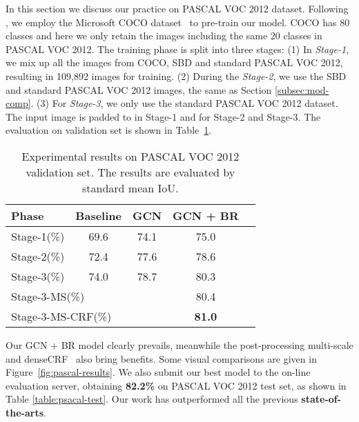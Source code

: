 \documentclass[10pt,twocolumn,letterpaper]{article}
\begin{document}
\label{sec:pascal-voc-2012}
   In this section we discuss our practice on PASCAL VOC 2012 dataset. Following \cite{chen14semantic,zheng2015conditional,liu2015semantic,chen2016deeplab}, we employ the Microsoft COCO dataset~\cite{lin2014microsoft} to pre-train our model. COCO has 80 classes and here we only retain the images including the same 20 classes in PASCAL VOC 2012. The training phase is split into three stages: (1) In \emph{Stage-1}, we mix up all the images from COCO, SBD and standard PASCAL VOC 2012, resulting in 109,892 images for training. (2) During the \emph{Stage-2}, we use the SBD and standard PASCAL VOC 2012 images, the same as Section \ref{subsec:mod-comp}. (3) For \emph{Stage-3}, we only use the standard PASCAL VOC 2012 dataset. The input image is padded to  in Stage-1 and  for Stage-2 and Stage-3. The evaluation on validation set is shown in Table~\ref{table:psacal-val}. 
   \begin{table}[h]
      \begin{center}
         \begin{tabular}{|l|c|c|c|c|}
            \hline
            Phase  & Baseline & GCN & GCN + BR \\
            \hline
            Stage-1(\%) & 69.6 & 74.1 & 75.0\\
            \hline
            Stage-2(\%) & 72.4 & 77.6 & 78.6\\
            \hline 
            Stage-3(\%) & 74.0 & 78.7 & 80.3\\
            \hline
            \hline 
            \multicolumn{3}{|l|}{Stage-3-MS(\%)} & 80.4\\
            \hline
            \multicolumn{3}{|l|}{Stage-3-MS-CRF(\%)} & \textbf{81.0}\\
            \hline
         \end{tabular}
      \end{center}
      \caption{Experimental results on PASCAL VOC 2012 validation set. The results are evaluated by standard mean IoU.}
      \label{table:psacal-val}
   \end{table}
\par
   Our GCN + BR model clearly prevails, meanwhile the post-processing multi-scale and denseCRF~\cite{koltun2011efficient} also bring benefits. Some visual comparisons are given in Figure~\ref{fig:pascal-results}. We also submit our best model to the on-line evaluation server, obtaining \textbf{82.2\%} on PASCAL VOC 2012 test set, as shown in Table \ref{table:psacal-test}. Our work has outperformed all the previous \textbf{state-of-the-arts}.
\end{document}
